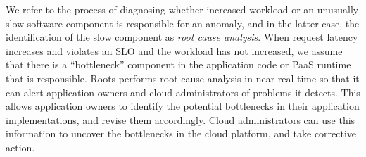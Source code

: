 We refer to the process of diagnosing whether increased workload or
an unusually slow software component is responsible for an anomaly, and in the
latter case, the identification of the slow component as \textit{root cause
analysis}.  When request latency increases and violates an SLO and the
workload has not increased, we assume that there is a ``bottleneck'' component
in the application code or PaaS runtime that is responsible.  Roots performs
root cause analysis in near real time so that it can alert application owners and
cloud administrators of problems it detects. This allows application owners to
identify the potential bottlenecks in their application implementations, and revise them
accordingly. Cloud administrators can use this information to uncover the bottlenecks in the cloud
platform, and take corrective action.



